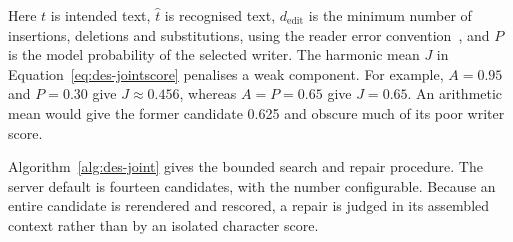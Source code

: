 Here $t$ is intended text, $\widehat t$ is recognised text, $d_{\mathrm{edit}}$ is the minimum number of insertions, deletions and substitutions, using the reader error convention~\cite[PDF p.~2, Sec.~2.1]{graves2006}, and $P$ is the model probability of the selected writer. The harmonic mean $J$ in Equation~\ref{eq:des-jointscore} penalises a weak component. For example, $A=0.95$ and $P=0.30$ give $J\approx0.456$, whereas $A=P=0.65$ give $J=0.65$. An arithmetic mean would give the former candidate 0.625 and obscure much of its poor writer score.~\cite[style.py; synthesise.py; reproduce.py]{braunepipeline2026}

Algorithm~\ref{alg:des-joint} gives the bounded search and repair procedure. The server default is fourteen candidates, with the number configurable. Because an entire candidate is rerendered and rescored, a repair is judged in its assembled context rather than by an isolated character score.~\cite[style.py; synthesise.py]{braunepipeline2026}


\begin{designalgorithm}
\caption{Joint candidate search and bounded legibility repair~\cite{brauneevidence2026,braunepipeline2026}}
\label{alg:des-joint}
\begin{designpseudo}
\end{designpseudo}
\end{designalgorithm}

